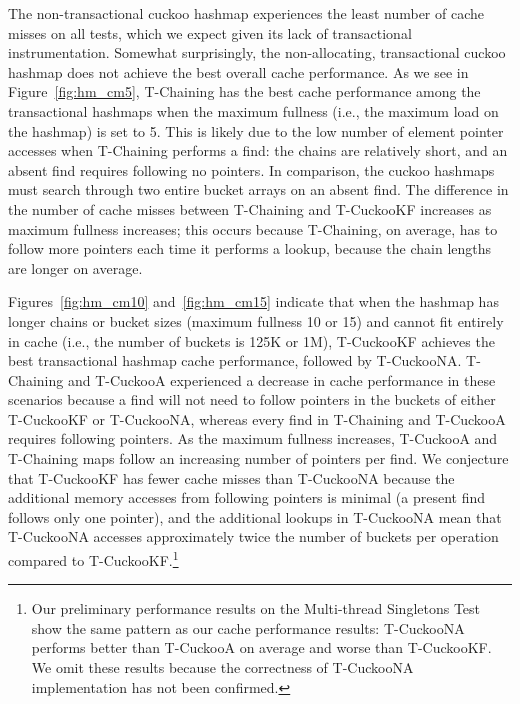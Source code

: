 The non-transactional cuckoo hashmap experiences the least number of cache misses on all tests, which we expect given its lack of transactional instrumentation. Somewhat surprisingly, the non-allocating, transactional cuckoo hashmap does not achieve the best overall cache performance. 
As we see in Figure~\ref{fig:hm_cm5}, T-Chaining has the best cache performance among the transactional hashmaps when the maximum fullness (i.e., the maximum load on the hashmap) is set to 5. This is likely due to the low number of element pointer accesses when T-Chaining performs a find: the chains are relatively short, and an absent find requires following no pointers. In comparison, the cuckoo hashmaps must search through two entire bucket arrays on an absent find. The difference in the number of cache misses between T-Chaining and T-CuckooKF increases as maximum fullness increases; this occurs because T-Chaining, on average, has to follow more pointers each time it performs a lookup, because the chain lengths are longer on average.

Figures~\ref{fig:hm_cm10} and~\ref{fig:hm_cm15} indicate that when the hashmap has longer chains or bucket sizes (maximum fullness 10 or 15) and cannot fit entirely in cache (i.e., the number of buckets is 125K or 1M), T-CuckooKF achieves the best transactional hashmap cache performance, followed by T-CuckooNA. 
T-Chaining and T-CuckooA experienced a decrease in cache performance in these scenarios because a find will not need to follow pointers in the buckets of either T-CuckooKF or T-CuckooNA, whereas every find in T-Chaining and T-CuckooA requires following pointers. As the maximum fullness increases, T-CuckooA and T-Chaining maps follow an increasing number of pointers per find.
We conjecture that T-CuckooKF has fewer cache misses than T-CuckooNA because the additional memory accesses from following pointers is minimal (a present find follows only one pointer), and the additional lookups in T-CuckooNA mean that T-CuckooNA accesses approximately twice the number of buckets per operation compared to T-CuckooKF.\footnote{Our preliminary performance results on the Multi-thread Singletons Test show the same pattern as our cache performance results: T-CuckooNA performs better than T-CuckooA on average and worse than T-CuckooKF. We omit these results because the correctness of T-CuckooNA implementation has not been confirmed.}

\vspace{12pt}
\noindent{}

